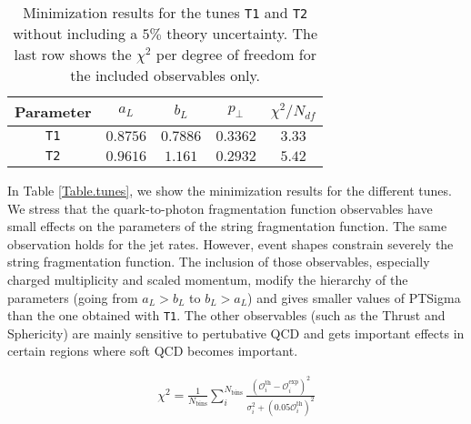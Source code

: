 \documentclass[aps,preprint,floatfix,nofootinbib,showpacs]{revtex4-1}
\begin{document}
\begin{table}[!h]
 \begin{center}
  \begin{tabular}{ c | c | c | c | c }
  \hline \hline
   Parameter   & \hspace{0.8cm} $a_L$  \hspace{0.8cm} & \hspace{0.8cm} $b_L$  \hspace{0.8cm} & \hspace{0.8cm} $p_\perp$ \hspace{0.8cm}  & \hspace{0.8cm} $\chi^2/N_{df}$ \hspace{0.8cm} \\ \hline
   \texttt{T1} & $0.8756$      & $0.7886$  & $0.3362$  & $3.33$          \\ \hline
   \texttt{T2} & $0.9616$      & $1.161$   & $0.2932$  & $5.42$          \\ \hline \hline
  \end{tabular}
 \end{center}
 \caption{Minimization results for the tunes \texttt{T1} and \texttt{T2} without including a $5\%$ theory
 uncertainty. The last row shows the $\chi^2$ per degree of freedom for the included observables only.}
 \label{Table.tunes-without_theo.uncertainty}
\end{table}

In Table \ref{Table.tunes}, we show 
the minimization results for the different tunes. We stress
that the quark-to-photon fragmentation
function observables have small effects on the parameters of the string 
fragmentation function. The same observation holds for the jet rates. 
However, event shapes constrain severely the string fragmentation function. 
The inclusion of those  observables, especially charged multiplicity 
and scaled momentum, modify the hierarchy of the parameters 
(going from $a_L > b_L$ to $b_L > a_L$) and gives smaller 
values of \textsf{PTSigma} than the one obtained with 
\texttt{T1}. The other observables (such
as the Thrust and Sphericity) are mainly sensitive 
to pertubative QCD and gets important effects in certain
regions where soft QCD becomes important. 

\begin{eqnarray}
 \chi^2 = \frac{1}{N_\textrm{bins}} \sum_i^{N_\textrm{bins}} \frac{(\mathcal{O}_i^\textrm{th} - \mathcal{O}_i^\textrm{exp})^2}
 {\sigma^2_i + (0.05  \mathcal{O}_i^\textrm{th})^2}
 \label{chi2}
\end{eqnarray}
\end{document}
